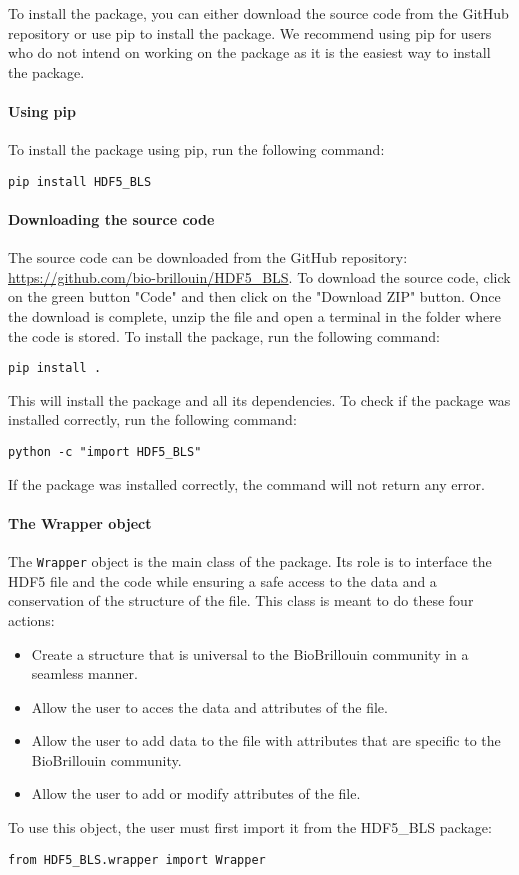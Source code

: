 To install the package, you can either download the source code from the GitHub repository or use pip to install the package. We recommend using pip for users who do not intend on working on the package as it is the easiest way to install the package.

\paragraph{Using pip}
    To install the package using pip, run the following command:
\begin{lstlisting}
pip install HDF5_BLS
\end{lstlisting}   

\paragraph{Downloading the source code}
The source code can be downloaded from the GitHub repository: \url{https://github.com/bio-brillouin/HDF5_BLS}. To download the source code, click on the green button "Code" and then click on the "Download ZIP" button. Once the download is complete, unzip the file and open a terminal in the folder where the code is stored. To install the package, run the following command:
\begin{lstlisting}
pip install .
\end{lstlisting}

This will install the package and all its dependencies. To check if the package was installed correctly, run the following command:
\begin{lstlisting}
python -c "import HDF5_BLS"
\end{lstlisting}

If the package was installed correctly, the command will not return any error.

\paragraph{The Wrapper object}

The \texttt{Wrapper} object is the main class of the package. Its role is to interface the HDF5 file and the code while ensuring a safe access to the data and a conservation of the structure of the file. This class is meant to do these four actions:
\begin{itemize}
    \item Create a structure that is universal to the BioBrillouin community in a seamless manner.
    \item Allow the user to acces the data and attributes of the file.
    \item Allow the user to add data to the file with attributes that are specific to the BioBrillouin community.
    \item Allow the user to add or modify attributes of the file.
\end{itemize}

To use this object, the user must first import it from the HDF5\_BLS package:
\begin{lstlisting}
from HDF5_BLS.wrapper import Wrapper
\end{lstlisting}


 